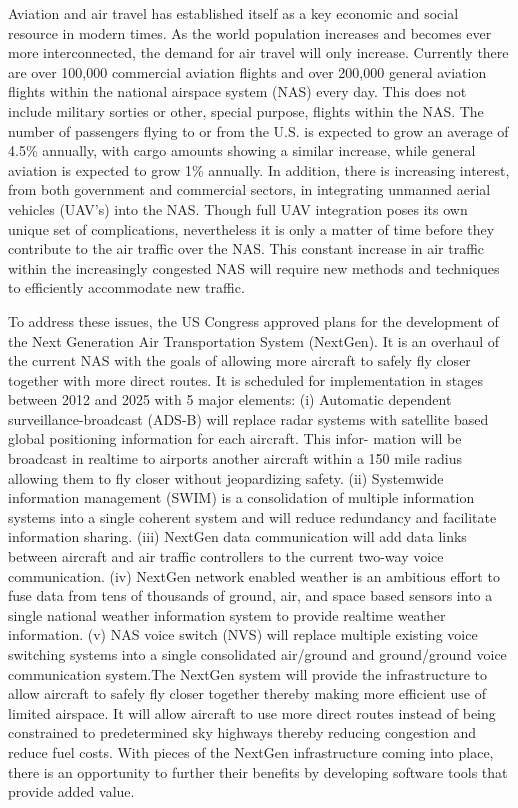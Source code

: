 Aviation and air travel has established itself as a key economic and social resource in modern times. As the world population increases and becomes ever more interconnected, the demand for air travel will only increase. Currently there are over 100,000 commercial aviation flights and over 200,000 general aviation flights within the national airspace system (NAS) every day. This does not include military sorties or other, special purpose, flights within the NAS. The number of passengers flying to or from the U.S. is expected to grow an
average of 4.5\% annually, with cargo amounts showing a similar increase, while general aviation is expected to
grow 1\% annually. In addition, there is increasing interest, from both government and commercial sectors, in integrating unmanned aerial vehicles (UAV’s) into the NAS. Though full UAV integration poses its own unique set of complications, nevertheless it is only a matter of time before they contribute to the air traffic over the NAS. This constant increase in air traffic within the increasingly congested NAS will require new methods and techniques to efficiently accommodate new traffic.

To address these issues, the US Congress approved plans for the development of the Next Generation Air Transportation System (NextGen). It is an overhaul of the current NAS with the goals of allowing more aircraft to safely fly closer together with more direct
routes. It is scheduled for implementation in stages between 2012 and 2025 with 5 major elements: (i) Automatic dependent surveillance-broadcast (ADS-B) will replace radar systems with satellite based global positioning information for each aircraft. This infor- mation will be broadcast in realtime to airports another aircraft within a 150 mile radius allowing them to fly closer without jeopardizing safety. (ii) Systemwide information management (SWIM) is a consolidation of multiple information systems into a single coherent system and will reduce redundancy and facilitate information sharing. (iii) NextGen data communication will add data links between aircraft and air traffic controllers to the current two-way voice communication. (iv) NextGen network enabled weather is an ambitious effort to fuse data from tens of thousands of ground, air, and space based sensors into a single national weather information system to provide realtime weather information. (v) NAS voice switch (NVS) will replace multiple existing voice switching systems into a single consolidated air/ground and ground/ground voice communication system.The NextGen system will provide the infrastructure to allow aircraft to safely fly closer together thereby making more efficient use of limited airspace. It will allow aircraft to use more direct routes instead of being constrained to predetermined sky highways thereby
reducing congestion and reduce fuel costs. With pieces of the NextGen infrastructure coming into place, there is an opportunity to further their benefits by developing software tools that provide added value.

